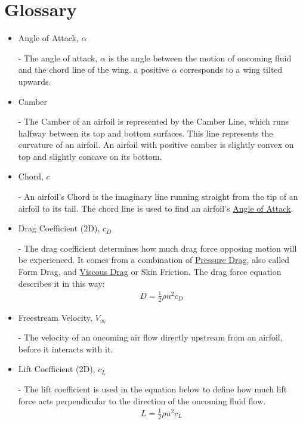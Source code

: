 \documentclass{article}
\begin{document}
\section{Glossary}
\begin{itemize}
		
	\item \hypertarget{alpha}{Angle of Attack, $\alpha$} - The angle of attack, $\alpha$ is the angle between the motion of oncoming fluid and the chord line of the wing. a positive $\alpha$ corresponds to a wing tilted upwards.
	
	\item \hypertarget{Camber}{Camber} - The Camber of an airfoil is represented by the Camber Line, which runs halfway between its top and bottom surfaces. This line represents the curvature of an airfoil. An airfoil with positive camber is slightly convex on top and slightly concave on its bottom.
	
	\item \hypertarget{c}{Chord, $c$} - An airfoil's Chord is the imaginary line running straight from the tip of an airfoil to its tail. The chord line is used to find an airfoil's \hyperlink{alpha}{Angle of Attack}.

	\item \hypertarget{CD}{Drag Coefficient (2D), $c_{D}$} - The drag coefficient determines how much drag force opposing motion will be experienced. It comes from a combination of \hyperlink{DP}{Pressure Drag}, also called Form Drag, and \hyperlink{VD}{Viscous Drag} or Skin Friction. The drag force equation describes it in this way: 
		\begin{equation} \label{eq:13}
		\begin{aligned}
        			D = \frac{1}{2} \rho u^{2} c_{D}
	    	\end{aligned}
		\end{equation}
	
	\item \hypertarget{Vinf}{Freestream Velocity, $V_{\infty}$} - The velocity of an oncoming air flow directly upstream from an airfoil, before it interacts with it.
		
	\item \hypertarget{CL}{Lift Coefficient (2D), $c_{L}$} - The lift coefficient is used in the equation below to define how much lift force acts perpendicular to the direction of the oncoming fluid flow.
		\begin{equation} \label{eq:14}
		\begin{aligned}
        			L = \frac{1}{2} \rho u^{2} c_{L}
	    	\end{aligned}
		\end{equation}
	

\end{itemize}
\end{document}
